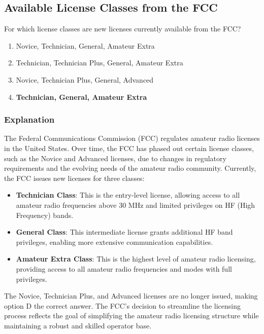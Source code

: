 \subsection{Available License Classes from the FCC}
\label{T1C01}

\begin{tcolorbox}[colback=gray!10!white,colframe=black!75!black,title=T1C01]
For which license classes are new licenses currently available from the FCC?
\begin{enumerate}[label=\Alph*)]
    \item Novice, Technician, General, Amateur Extra
    \item Technician, Technician Plus, General, Amateur Extra
    \item Novice, Technician Plus, General, Advanced
    \item \textbf{Technician, General, Amateur Extra}
\end{enumerate}
\end{tcolorbox}

\subsubsection{Explanation}
The Federal Communications Commission (FCC) regulates amateur radio licenses in the United States. Over time, the FCC has phased out certain license classes, such as the Novice and Advanced licenses, due to changes in regulatory requirements and the evolving needs of the amateur radio community. Currently, the FCC issues new licenses for three classes:

\begin{itemize}
    \item \textbf{Technician Class}: This is the entry-level license, allowing access to all amateur radio frequencies above 30 MHz and limited privileges on HF (High Frequency) bands.
    \item \textbf{General Class}: This intermediate license grants additional HF band privileges, enabling more extensive communication capabilities.
    \item \textbf{Amateur Extra Class}: This is the highest level of amateur radio licensing, providing access to all amateur radio frequencies and modes with full privileges.
\end{itemize}

The Novice, Technician Plus, and Advanced licenses are no longer issued, making option D the correct answer. The FCC's decision to streamline the licensing process reflects the goal of simplifying the amateur radio licensing structure while maintaining a robust and skilled operator base.

